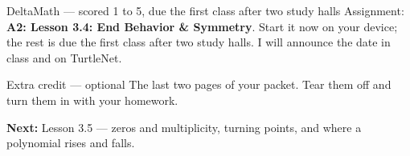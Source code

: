 \documentclass[aspectratio=169, 11pt]{beamer}
\begin{document}
\begin{frame}[t, plain]
  \begin{block}{DeltaMath --- scored 1 to 5, due the first class after two study halls}
    Assignment: \textbf{A2: Lesson 3.4: End Behavior \& Symmetry}. Start it now on your device;
    the rest is due the first class after two study halls. I will announce the date in class and
    on TurtleNet.
  \end{block}
  \vspace{4pt}
  \begin{block}{Extra credit --- optional}
    The last two pages of your packet. Tear them off and turn them in with your homework.
  \end{block}
  \vspace{6pt}
  \textbf{Next:} Lesson 3.5 --- zeros and multiplicity, turning points, and where a polynomial
  rises and falls.
\end{frame}
\end{document}
